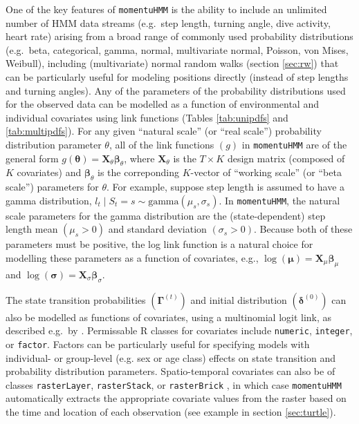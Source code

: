 \documentclass[12pt]{article}\usepackage[]{graphicx}\usepackage[]{color}
\begin{document}
One of the key features of \verb|momentuHMM| is the ability to include an unlimited number of HMM data streams (e.g.\ step length, turning angle, dive activity, heart rate) arising from a broad range of commonly used probability distributions (e.g.\ beta, categorical, gamma, normal, multivariate normal, Poisson, von Mises, Weibull), including (multivariate) normal random walks (section \ref{sec:rw}) that can be particularly useful for modeling positions directly (instead of step lengths and turning angles). Any of the parameters of the probability distributions used for the observed data can be modelled as a function of environmental and individual covariates using link functions (Tables \ref{tab:unipdfs} and \ref{tab:multipdfs}). For any given ``natural scale'' (or ``real scale'') probability distribution parameter $\theta$, all of the link functions $(g)$ in \verb|momentuHMM| are of the general form $g({\boldsymbol \theta}) =  {\mathbf X}_\theta{\boldsymbol \beta}_\theta$, where ${\mathbf X}_\theta$ is the $T \times K$ design matrix (composed of $K$ covariates) and ${\boldsymbol \beta}_\theta$ is the correponding $K$-vector of ``working scale'' (or ``beta scale'') parameters for $\theta$. For example, suppose step length is assumed to have a gamma distribution, $l_t\mid S_t=s \sim \text{gamma}(\mu_s,\sigma_s)$. In \verb|momentuHMM|, the natural scale parameters for the gamma distribution are the (state-dependent) step length mean $(\mu_s>0)$ and standard deviation $(\sigma_s>0)$.  Because both of these parameters must be positive, the log link function is a natural choice for modelling these parameters as a function of covariates, e.g., $\log({\boldsymbol \mu}) =  {\mathbf X}_\mu  {\boldsymbol \beta}_\mu$ and $\log({\boldsymbol \sigma}) =  {\mathbf X}_\sigma  {\boldsymbol \beta}_\sigma$.

The state transition probabilities $({\mathbf \Gamma}^{(t)})$ and initial distribution $({\boldsymbol \delta}^{(0)})$ can also be modelled as functions of covariates, using a multinomial logit link, as described e.g.\ by \cite{MichelotEtAl2016}. Permissable R classes for covariates include \verb|numeric|, \verb|integer|, or \verb|factor|. Factors can be particularly useful for specifying models with individual- or group-level (e.g. sex or age class) effects on state transition and probability distribution parameters. Spatio-temporal covariates can also be of classes \verb|rasterLayer|, \verb|rasterStack|, or \verb|rasterBrick| \citep{Hijmans2016}, in which case \verb|momentuHMM| automatically extracts the appropriate covariate values from the raster based on the time and location of each observation (see example in section \ref{sec:turtle}).
\end{document}
